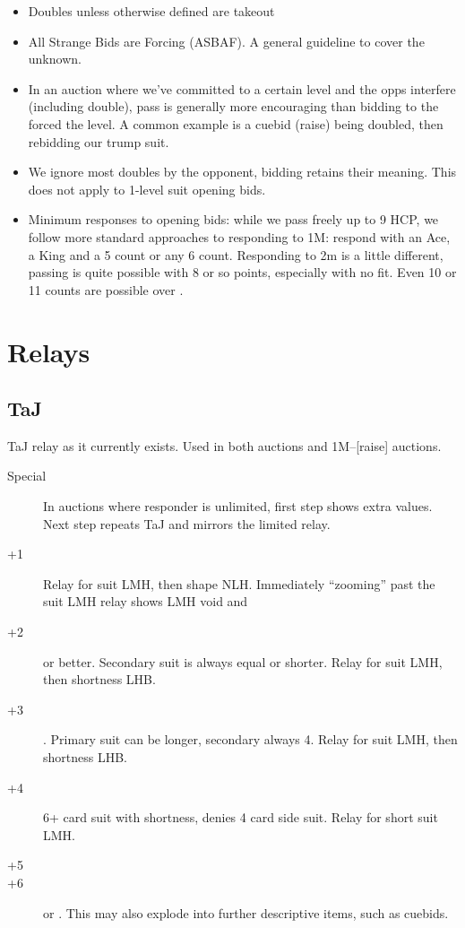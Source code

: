 \documentclass[tom-jenni]{subfile}
\begin{document}
\begin{itemize}
	\item Doubles unless otherwise defined are takeout
	\item All Strange Bids are Forcing (ASBAF).  A general guideline to cover the unknown.
	\item In an auction where we've committed to a certain level and the opps interfere (including double), pass is generally more encouraging than bidding to the forced the level.  A common example is a cuebid (raise) being doubled, then rebidding our trump suit.
	\item We ignore most doubles by the opponent, bidding retains their meaning.  This does not apply to 1-level suit opening bids.
	\item Minimum responses to opening bids: while we pass  freely up to 9 HCP, we follow more standard approaches to responding to 1M: respond with an Ace, a King and a 5 count or any 6 count.  Responding to 2m is a little different, passing is quite possible with 8 or so points, especially with no fit.  Even 10 or 11 counts are possible over .
\end{itemize}	

\section{Relays}

\subsection{TaJ}
TaJ relay as it currently exists.  Used in both  auctions and 1M--[raise] auctions.

\begin{description}
	\item[Special] In auctions where responder is unlimited, first step shows extra values.  Next step repeats TaJ and mirrors the limited relay.
	\item[+1]  Relay for \second suit LMH, then shape NLH.  Immediately ``zooming'' past the \second suit LMH relay shows LMH void and 
	\item[+2]  or better.  Secondary suit is always equal or shorter.  Relay for \second suit LMH, then shortness LHB.
	\item[+3] .  Primary suit can be longer, secondary always 4.  Relay for \second suit LMH, then shortness LHB.
	\item[+4] 6+ card suit with shortness, denies 4 card side suit.  Relay for short suit LMH.
	\item[+5] 
	\item[+6]  or .  This may also explode into further descriptive items, such as cuebids.  
\end{description}
\end{document}
